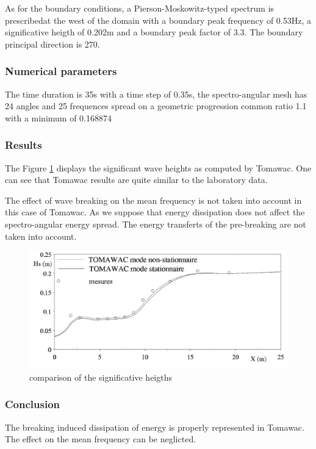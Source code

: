 As for the boundary conditions, a Pierson-Moskowitz-typed spectrum is prescribedat the west of the domain with a boundary peak frequency of 0.53Hz, a significative heigth of 0.202m and a boundary peak factor of 3.3. The boundary principal direction is 270.
%
%
\subsubsection{Numerical parameters}
%
The time duration is 35s with a time step of 0.35s, the spectro-angular mesh has 24 angles and 25 frequences spread on a geometric progression common ratio 1.1 with a minimum of 0.168874
%
%
\subsubsection{Results}
%
The Figure \ref{resultbj} displays the significant wave heights as computed by Tomawac. One can see that Tomawac results are quite similar to the laboratory data.

The effect of wave breaking on the mean frequency is not taken into account in this case of Tomawac. As we suppose that energy dissipation does not affect the spectro-angular energy spread. The energy transferts of the pre-breaking are not taken into account.  
\begin{figure} [!h]
\centering
\includegraphics{results.png}
 \caption{comparison of the significative heigths}
\label{resultbj}
\end{figure}
\subsubsection{Conclusion}
The breaking induced dissipation of energy is properly represented in Tomawac. The effect on the mean frequency can be neglicted.



